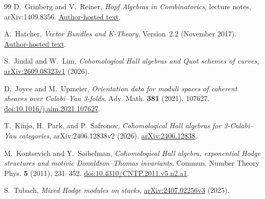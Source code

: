 \documentclass[11pt]{article}
\begin{document}
\begin{thebibliography}{99}
D.~Grinberg and V.~Reiner,
\emph{Hopf Algebras in Combinatorics},
lecture notes, arXiv:1409.8356.
\href{https://www-users.cse.umn.edu/~reiner/Classes/HopfComb.pdf}
{Author-hosted text}.

A.~Hatcher,
\emph{Vector Bundles and K-Theory},
Version~2.2 (November 2017).
\href{https://pi.math.cornell.edu/~hatcher/VBKT/VBpage.html}
{Author-hosted text}.

S.~Jindal and W.~Lim,
\emph{Cohomological Hall algebras and Quot schemes of curves},
\href{https://arxiv.org/abs/2609.08323v1}
{arXiv:2609.08323v1} (2026).

D.~Joyce and M.~Upmeier,
\emph{Orientation data for moduli spaces of coherent sheaves over
Calabi--Yau 3-folds},
Adv. Math. \textbf{381} (2021), 107627.
\href{https://doi.org/10.1016/j.aim.2021.107627}
{doi:10.1016/j.aim.2021.107627}.

T.~Kinjo, H.~Park, and P.~Safronov,
\emph{Cohomological Hall algebras for 3-Calabi--Yau categories},
arXiv:2406.12838v2 (2026).
\href{https://arxiv.org/abs/2406.12838}
{arXiv:2406.12838}.

M.~Kontsevich and Y.~Soibelman,
\emph{Cohomological Hall algebra, exponential Hodge structures and motivic
Donaldson--Thomas invariants},
Commun. Number Theory Phys. \textbf{5} (2011), 231--352.
\href{https://doi.org/10.4310/CNTP.2011.v5.n2.a1}
{doi:10.4310/CNTP.2011.v5.n2.a1}.

S.~Tubach,
\emph{Mixed Hodge modules on stacks},
\href{https://arxiv.org/abs/2407.02256v3}
{arXiv:2407.02256v3} (2025).

\end{thebibliography}
\end{document}
